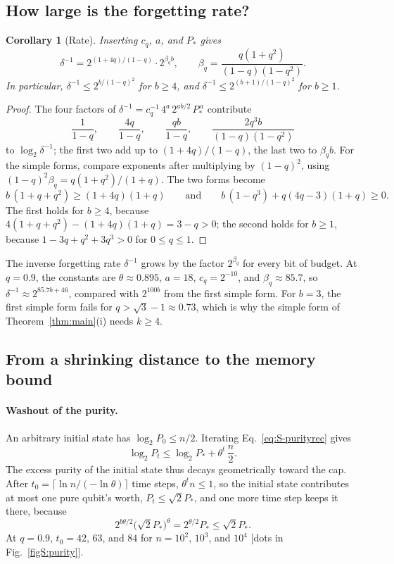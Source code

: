 \documentclass[aps,prl,twocolumn,superscriptaddress,floatfix]{revtex4-2}
\theoremstyle{plain}
\newtheorem{corollary}[lemma]{Corollary}
\begin{document}
\subsection{How large is the forgetting rate?}
\label{sm:rate}

\begin{corollary}[Rate]\label{cor:rate}
Inserting $c_q$, $a$, and $P_*$ gives
\begin{equation}
\delta^{-1}=2^{(1+4q)/(1-q)}\cdot2^{\beta_qb},\qquad\beta_q=\frac{q(1+q^2)}{(1-q)(1-q^2)} .
\label{eq:S-rate}
\end{equation}
In particular, $\delta^{-1}\le2^{b/(1-q)^2}$ for $b\ge4$, and $\delta^{-1}\le2^{(b+1)/(1-q)^2}$ for $b\ge1$.
\end{corollary}

\begin{proof}
The four factors of $\delta^{-1}=c_q^{-1}\,4^{a}\,2^{ab/2}\,P_*^{\,a}$ contribute
\[
\frac1{1-q},\qquad\frac{4q}{1-q},\qquad\frac{qb}{1-q},\qquad\frac{2q^3b}{(1-q)(1-q^2)}
\]
to $\log_2\delta^{-1}$; the first two add up to $(1+4q)/(1-q)$, the last two to $\beta_qb$. For the simple forms, compare exponents after multiplying by $(1-q)^2$, using $(1-q)^2\beta_q=q(1+q^2)/(1+q)$. The two forms become
\[
b\,(1+q+q^2)\ge(1+4q)(1+q)\qquad\text{and}\qquad b\,(1-q^3)+q(4q-3)(1+q)\ge0 .
\]
The first holds for $b\ge4$, because $4(1+q+q^2)-(1+4q)(1+q)=3-q>0$; the second holds for $b\ge1$, because $1-3q+q^2+3q^3>0$ for $0\le q\le1$.
\end{proof}

The inverse forgetting rate $\delta^{-1}$ grows by the factor $2^{\beta_q}$ for every bit of budget. At $q=0.9$, the constants are $\theta\approx0.895$, $a=18$, $c_q=2^{-10}$, and $\beta_q\approx85.7$, so $\delta^{-1}\approx2^{85.7b+46}$, compared with $2^{100b}$ from the first simple form. For $b=3$, the first simple form fails for $q>\sqrt3-1\approx0.73$, which is why the simple form of Theorem~\ref{thm:main}(i) needs $k\ge4$.

\subsection{From a shrinking distance to the memory bound}
\label{sm:memory}

\paragraph*{Washout of the purity.} An arbitrary initial state has $\log_2P_0\le n/2$. Iterating Eq.~\eqref{eq:S-purityrec} gives
\begin{equation}
\log_2P_t\le\log_2P_*+\theta^t\,\frac n2 .
\label{eq:S-washout}
\end{equation}
The excess purity of the initial state thus decays geometrically toward the cap. After $t_0=\lceil\ln n/(-\ln\theta)\rceil$ time steps, $\theta^tn\le1$, so the initial state contributes at most one pure qubit's worth, $P_t\le\sqrt2P_*$, and one more time step keeps it there, because
\[
2^{b\theta/2}\bigl(\sqrt2P_*\bigr)^\theta=2^{\theta/2}P_*\le\sqrt2P_* .
\] At $q=0.9$, $t_0=42$, $63$, and $84$ for $n=10^2$, $10^3$, and $10^4$ [dots in Fig.~\ref{figS:purity}].
\end{document}
